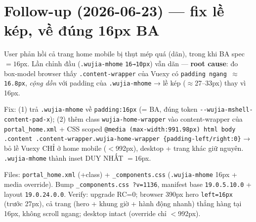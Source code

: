 \section{Follow-up (2026-06-23) --- fix lề kép, về đúng 16px BA}

User phản hồi cả trang home mobile bị thụt mép quá (dãn), trong khi BA spec
\(=16\)px. Lần chỉnh đầu (\texttt{.wujia-mhome} \texttt{16→10px}) vẫn dãn ---
\textbf{root cause}: đo box-model browser thấy \texttt{.content-wrapper} của Vuexy
có \texttt{padding ngang \(\approx\)16.8px}, \emph{cộng dồn} với padding của
\texttt{.wujia-mhome} → lề kép (\(\approx\)27--33px) thay vì 16px.

Fix: (1) trả \texttt{.wujia-mhome} về \texttt{padding:16px} (= BA, đúng token
\texttt{-{}-wujia-mshell-content-pad-x}); (2) thêm class \texttt{wujia-home-wrapper}
vào content-wrapper của \texttt{portal\_home.xml} + CSS scoped
\texttt{@media (max-width:991.98px) html body .content .content-wrapper.wujia-home-wrapper \{padding-left/right:0\}}
→ bỏ lề Vuexy CHỈ ở home mobile (\(<\)992px), desktop + trang khác giữ nguyên.
\texttt{.wujia-mhome} thành inset DUY NHẤT \(=16\)px.

Files: \texttt{portal\_home.xml} (+class) + \texttt{\_components.css} (\texttt{.wujia-mhome}
16px + media override). Bump \texttt{\_components.css ?v=1136}, manifest base
\texttt{19.0.5.10.0} + layout \texttt{19.0.24.0.0}. Verify: upgrade RC=0; browser
390px hero \texttt{left=16px} (trước 27px), cả trang (hero + khung giờ + hành động
nhanh) thẳng hàng tại 16px, không scroll ngang; desktop intact (override chỉ
\(<\)992px).
